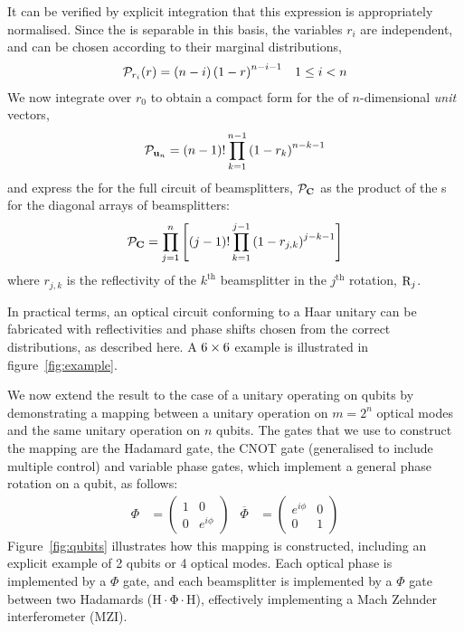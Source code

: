 It can be verified by explicit integration that this expression is appropriately
normalised. Since the \pdf{} is separable in this basis, the variables \( r_i
\) are independent, and can be chosen according to their marginal distributions,
\begin{align}
  \mathcal{P}_{r_{i}} \!\left(r\right) = \left( n-i \right) \left( 1-r \right)^{n-i-1} &&
  1 \leq i < n
\end{align}
We now integrate over \(r_{0}\) to obtain a compact form for the \pdf{} of
\(n\)-dimensional \emph{unit} vectors,
\begin{equation}
  \mathcal{P}_{ \mathbf{u}_n } = \left( n-1 \right)! \prod_{k=1}^{n-1} \left( 1-r_k
  \right)^{n-k-1}
\end{equation}
and express the \pdf{} for the full circuit of beamsplitters,
\(\mathcal{P}_{\mathbf{C}}\) as the product of the \pdf{}s for the diagonal arrays of
beamsplitters:
\begin{equation}
  \mathcal{P}_{\mathbf{C}} = \prod_{j=1}^{n} \left[ \left( j-1 \right)!
  \prod_{k=1}^{j-1} \left( 1-r_{j,k} \right)^{j-k-1} \right]
\end{equation}
where \( r_{j,k} \) is the reflectivity of the \( k^{\text{th}} \) beamsplitter
in the \( j^{\text{th}} \) rotation, \( \mathrm{R}_j \).

In practical terms, an optical circuit conforming to a Haar unitary can be
fabricated with reflectivities and phase shifts chosen from the correct
distributions, as described here. A \( 6 \times 6 \) example is illustrated in
figure~\ref{fig:example}.

We now extend the result to the case of a unitary operating on qubits by
demonstrating a mapping between a unitary operation on \(m=2^{n}\) optical
modes and the same unitary operation on \(n\) qubits. The gates that we use to
construct the mapping are the Hadamard gate, the CNOT gate (generalised to
include multiple control) and variable phase gates, which implement a general
phase rotation on a qubit, as follows:
\begin{align}
  \Phi &= \begin{pmatrix}
    1 & 0 \\
    0 & e^{i\phi}
  \end{pmatrix} &
  \overline{\Phi} &= \begin{pmatrix}
    e^{i\phi} & 0 \\
    0 & 1
  \end{pmatrix}
\end{align}
Figure~\ref{fig:qubits} illustrates how this mapping is constructed, including
an explicit example of 2 qubits or 4 optical modes. Each optical phase is
implemented by a \(\Phi\) gate, and each beamsplitter is implemented by a
\(\Phi\) gate between two Hadamards (\(\mathrm{H \cdot \Phi \cdot H}\)),
effectively implementing a Mach Zehnder interferometer (MZI).

